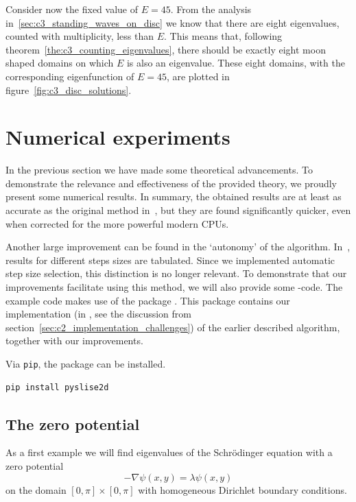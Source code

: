 Consider now the fixed value of $E = 45$. From the analysis in~\ref{sec:c3_standing_waves_on_disc} we know that there are eight eigenvalues, counted with multiplicity, less than $E$. This means that, following theorem~\ref{the:c3_counting_eigenvalues}, there should be exactly eight moon shaped domains on which $E$ is also an eigenvalue. These eight domains, with the corresponding eigenfunction of $E = 45$, are plotted in figure~\ref{fig:c3_disc_solutions}.

\section{Numerical experiments}\label{sec:c3_experiments}

In the previous section we have made some theoretical advancements. To demonstrate the relevance and effectiveness of the provided theory, we proudly present some numerical results. In summary, the obtained results are at least as accurate as the original method in~\cite{ixaru_new_2010}, but they are found significantly quicker, even when corrected for the more powerful modern CPUs.

Another large improvement can be found in the `autonomy' of the algorithm. In~\cite{ixaru_new_2010}, results for different steps sizes are tabulated. Since we implemented automatic step size selection, this distinction is no longer relevant. To demonstrate that our improvements facilitate using this method, we will also provide some \lpython{}-code. The example code makes use of the package \pyslisetd{}. This package contains our implementation (in \cpp{}, see the discussion from section~\ref{sec:c2_implementation_challenges}) of the earlier described algorithm, together with our improvements.

Via \texttt{pip}, the package \pyslisetd{} can be installed.
\begin{verbatim}
pip install pyslise2d
\end{verbatim}

\subsection{The zero potential}\label{sec:c3_experiments_zero}

As a first example we will find eigenvalues of the Schrödinger equation with a zero potential
$$
  -\nabla \psi(x, y) = \lambda \psi(x, y)
$$
on the domain $[0, \pi] \times [0, \pi]$ with homogeneous Dirichlet boundary conditions.

